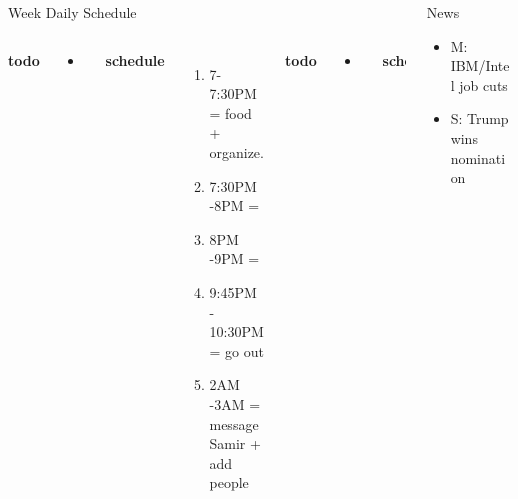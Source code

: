 \documentclass[serif, mathserif, final]{beamer}
\begin{document}
\begin{frame}
\begin{columns}
\begin{column}{0.50\linewidth}
\begin{block}{Week Daily Schedule}
\begin{columns}
          \textbf{\small todo}\\
          \begin{itemize} 
            \tiny \item \tiny
          \end{itemize}
          \textbf{\small schedule}\\ 
          \begin{enumerate}
            \tiny \item \tiny 7-7:30PM = food + organize.  
            \tiny \item \tiny 7:30PM -8PM = 
            \tiny \item \tiny 8PM -9PM = 
            \tiny \item \tiny 9:45PM - 10:30PM = go out 
            \tiny \item \tiny 2AM -3AM =  message Samir + add people
          \end{enumerate}
          
          \textbf{\small todo}\\
          \begin{itemize} 
           \tiny \item \tiny 
          \end{itemize}

          \textbf{\small schedule}\\
          \begin{enumerate} 
            \tiny \item \tiny 3PM - 4PM  =
          \item \tiny 5-7PM = Comm work 
          \item \tiny 8PM - 10PM = worklife work. 
          \end{enumerate} 
        \end{columns}
      \end{block}
    \end{column}%
    
    \begin{column}{0.20\linewidth}
      \begin{block}{News}
        \begin{itemize} 
          \tiny \item \tiny M: IBM/Intel job cuts 
          \tiny \item \tiny S: Trump  wins nomination
        \end{itemize}
      \end{block}
      


\end{column}
\end{columns}
\end{frame}
\end{document}
